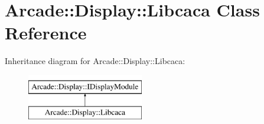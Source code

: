 \hypertarget{classArcade_1_1Display_1_1Libcaca}{}\section{Arcade\+::Display\+::Libcaca Class Reference}
\label{classArcade_1_1Display_1_1Libcaca}
Inheritance diagram for Arcade\+::Display\+::Libcaca\+:\begin{figure}[H]
\begin{center}
\leavevmode
\includegraphics[height=2.000000cm]{classArcade_1_1Display_1_1Libcaca}
\end{center}
\end{figure}
